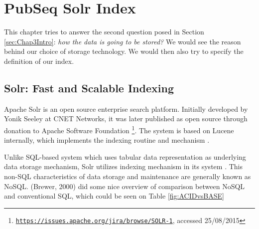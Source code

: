 
\chapter{PubSeq Solr Index} %

\label{Chapter5} %


This chapter tries to answer the second question posed in Section \ref{sec:Chap3Intro}: \textit{how the data is going to be stored?} We would see the reason behind our choice of storage technology. We would then also try to specify the definition of our index.


\section{Solr: Fast and Scalable Indexing}

Apache Solr is an open source enterprise search platform. Initially developed by Yonik Seeley at CNET Networks, it was later published as open source through donation to Apache Software Foundation \footnote{\href{https://issues.apache.org/jira/browse/SOLR-1}{\texttt{https://issues.apache.org/jira/browse/SOLR-1}}, accessed 25/08/2015}. The system is based on Lucene internally, which implements the indexing routine and mechanism \citep{hatcher2004lucene}.

Unlike SQL-based system which uses tabular data representation as underlying data storage mechanism, Solr utilizes indexing mechanism in its system \citep{smiley2015apache}. This non-SQL characteristics of data storage and maintenance are generally known as NoSQL. (Brewer, 2000) \citep{brewer2000towards} did some nice overview of comparison between NoSQL and conventional SQL, which could be seen on Table \ref{fig:ACIDvsBASE}


